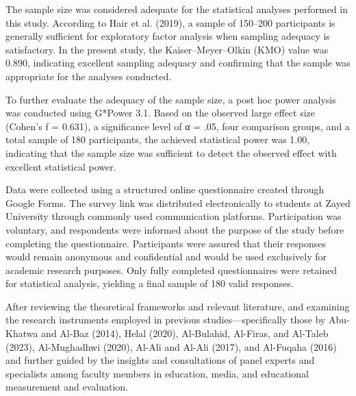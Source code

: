 \documentclass{NSP1}
\begin{document}
\par\medskip{}\smallskip

The sample size was considered adequate for the statistical analyses performed in this study. According to Hair et al. (2019), a sample of 150–200 participants is generally sufficient for exploratory factor analysis when sampling adequacy is satisfactory. In the present study, the Kaiser–Meyer–Olkin (KMO) value was 0.890, indicating excellent sampling adequacy and confirming that the sample was appropriate for the analyses conducted.

To further evaluate the adequacy of the sample size, a post hoc power analysis was conducted using G*Power 3.1. Based on the observed large effect size (Cohen's f = 0.631), a significance level of α = .05, four comparison groups, and a total sample of 180 participants, the achieved statistical power was 1.00, indicating that the sample size was sufficient to detect the observed effect with excellent statistical power.

\par\medskip{}\smallskip

Data were collected using a structured online questionnaire created through Google Forms. The survey link was distributed electronically to students at Zayed University through commonly used communication platforms. Participation was voluntary, and respondents were informed about the purpose of the study before completing the questionnaire. Participants were assured that their responses would remain anonymous and confidential and would be used exclusively for academic research purposes. Only fully completed questionnaires were retained for statistical analysis, yielding a final sample of 180 valid responses.

\par\medskip{}\smallskip

After reviewing the theoretical frameworks and relevant literature, and examining the research instruments employed in previous studies—specifically those by Abu-Khatwa and Al-Baz (2014), Helal (2020), Al-Bulahid, Al-Firas, and Al-Taleb (2023), Al-Mughadhwi (2020), Al-Ali and Al-Ali (2017), and Al-Fuqaha (2016) and further guided by the insights and consultations of panel experts and specialists among faculty members in education, media, and educational measurement and evaluation.
\end{document}
